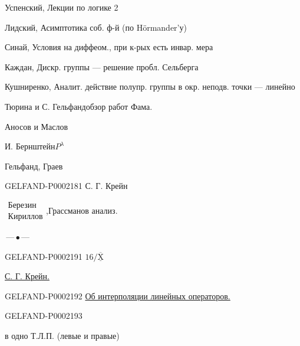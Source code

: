 Успенский, Лекции по логике 2



Лидский, Асимптотика соб. ф-й (по Hörmander'у)



Синай, Условия на диффеом., при к-рых есть инвар. мера



Каждан, Дискр. группы --- решение пробл. Сельберга



Кушниренко, Аналит. действие полупр. группы в окр. неподв. точки --- линейно







Тюрина и С. Гельфанд\quad обзор работ Фама.

Аносов и Маслов

И. Бернштейн\quad $P^{\lambda}$

Гельфанд, Граев

\begin{GelfandAdjacentEvidence}{GELFAND-P000218}{1}
С. Г. Крейн\quad {}
\end{GelfandAdjacentEvidence}


$\begin{gathered}\text{Березин}\\\text{Кириллов}\end{gathered}$,\quad Грассманов анализ.

\begin{center}
$\text{—}\,\bullet\,\text{—}$
\end{center}





\begin{GelfandAdjacentEvidence}{GELFAND-P000219}{1}
$16/\underline{\overline{\mathrm{X}}}$\quad {}
\end{GelfandAdjacentEvidence}
\quad \underline{С. Г. Крейн.}

\begin{GelfandAdjacentEvidence}{GELFAND-P000219}{2}
\underline{Об интерполяции линейных операторов.}






\end{GelfandAdjacentEvidence}
\begin{GelfandAdjacentEvidence}{GELFAND-P000219}{3}

\end{GelfandAdjacentEvidence}
 в одно Т.Л.П. (левые и правые)


